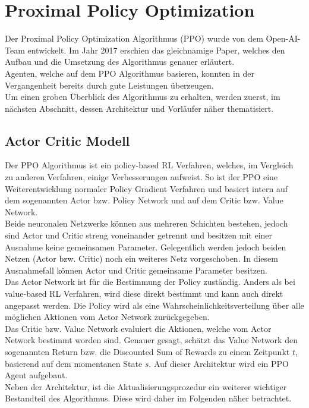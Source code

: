 \section{Proximal Policy Optimization} \label{sec:Grundlagen_PPO}
Der Proximal Policy Optimization Algorithmus (PPO) wurde von dem Open-AI-Team entwickelt. Im Jahr 2017 erschien das gleichnamige Paper, welches den Aufbau und die Umsetzung des Algorithmus genauer erläutert. \citep{PPO} \\
Agenten, welche auf dem PPO Algorithmus basieren, konnten in der Vergangenheit bereits durch gute Leistungen überzeugen.\\
Um einen groben Überblick des Algorithmus zu erhalten, werden zuerst, im nächsten Abschnitt, dessen Architektur und Vorläufer näher thematisiert.

\subsection{Actor Critic Modell} \label{subsec:Grundlagen_actor_critic}
Der PPO Algorithmus ist ein policy-based  RL Verfahren, welches, im Vergleich zu anderen Verfahren, einige Verbesserungen aufweist. So ist der PPO eine Weiterentwicklung normaler Policy Gradient Verfahren und basiert intern auf dem sogenannten Actor bzw. Policy Network und auf dem Critic bzw. Value Network. \citep[S. 273 f.]{Sutton1998}\\
Beide neuronalen Netzwerke können aus mehreren Schichten bestehen, jedoch sind Actor und Critic streng voneinander getrennt und besitzen mit einer Ausnahme keine gemeinsamen Parameter. Gelegentlich werden jedoch beiden Netzen (Actor bzw. Critic) noch ein weiteres Netz vorgeschoben. In diesem Ausnahmefall können Actor und Critic gemeinsame Parameter besitzen.\\
Das Actor Network ist für die Bestimmung der Policy zuständig. Anders als bei value-based  RL Verfahren, wird diese direkt bestimmt und kann auch direkt angepasst werden. Die Policy wird als eine Wahrscheinlichkeitsverteilung über alle möglichen Aktionen vom Actor Network zurückgegeben. \\
Das Critic bzw. Value Network evaluiert die Aktionen, welche vom Actor Network bestimmt worden sind. Genauer gesagt, schätzt das Value Network den sogenannten Return bzw. die Discounted Sum of Rewards  zu einem Zeitpunkt $t$, basierend auf dem momentanen State $s$. Auf dieser Architektur wird ein PPO Agent aufgebaut.\\
Neben der Architektur, ist die Aktualisierungsprozedur ein weiterer wichtiger Bestandteil des Algorithmus. Diese wird daher im Folgenden näher betrachtet.

